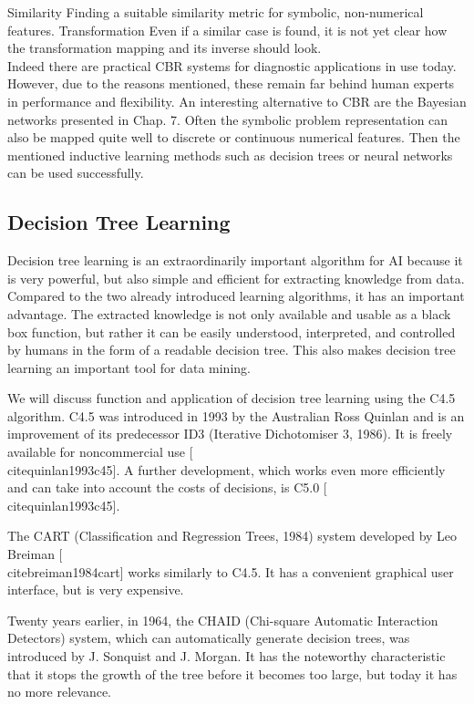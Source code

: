 \documentclass[10pt]{book}
\begin{document}
Similarity Finding a suitable similarity metric for symbolic, non-numerical features. Transformation Even if a similar case is found, it is not yet clear how the transformation mapping and its inverse should look.\\
Indeed there are practical CBR systems for diagnostic applications in use today. However, due to the reasons mentioned, these remain far behind human experts in performance and flexibility. An interesting alternative to CBR are the Bayesian networks presented in Chap. 7. Often the symbolic problem representation can also be mapped quite well to discrete or continuous numerical features. Then the mentioned inductive learning methods such as decision trees or neural networks can be used successfully.

\subsection*{Decision Tree Learning}
Decision tree learning is an extraordinarily important algorithm for AI because it is very powerful, but also simple and efficient for extracting knowledge from data. Compared to the two already introduced learning algorithms, it has an important advantage. The extracted knowledge is not only available and usable as a black box function, but rather it can be easily understood, interpreted, and controlled by humans in the form of a readable decision tree. This also makes decision tree learning an important tool for data mining.

We will discuss function and application of decision tree learning using the C4.5 algorithm. C4.5 was introduced in 1993 by the Australian Ross Quinlan and is an improvement of its predecessor ID3 (Iterative Dichotomiser 3, 1986). It is freely available for noncommercial use [\\cite{quinlan1993c45}]. A further development, which works even more efficiently and can take into account the costs of decisions, is C5.0 [\\cite{quinlan1993c45}].

The CART (Classification and Regression Trees, 1984) system developed by Leo Breiman [\\cite{breiman1984cart}] works similarly to C4.5. It has a convenient graphical user interface, but is very expensive.

Twenty years earlier, in 1964, the CHAID (Chi-square Automatic Interaction Detectors) system, which can automatically generate decision trees, was introduced by J. Sonquist and J. Morgan. It has the noteworthy characteristic that it stops the growth of the tree before it becomes too large, but today it has no more relevance.
\end{document}
